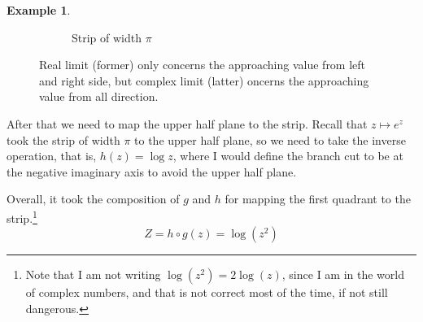 \documentclass[a4paper, 12pt]{article}
\theoremstyle{definition}
\newtheorem{example}{Example}
\numberwithin{theorem}{section}
\numberwithin{definition}{section}
\numberwithin{exercise}{section}
\numberwithin{remark}{section}
\numberwithin{figure}{section}
\numberwithin{example}{section}
\begin{document}
\begin{example}
\begin{figure}[tbp]
\begin{subfigure}[b]{0.4\textwidth}
            \caption{Strip of width $\pi$}
        \end{subfigure}
        \caption{Real limit (former) only concerns the approaching value from left and right side, but complex limit (latter) oncerns the approaching value from all direction.}
        \label{fig: Mapping from first quadrant to a strip}
    \end{figure}
    After that we need to map the upper half plane to the strip.
    Recall that $z \mapsto e^{z}$ took the strip of width $\pi$ to the upper half plane,
    so we need to take the inverse operation, that is, $h(z) = \log z$,
    where I would define the branch cut to be at the negative imaginary axis to avoid the upper half plane.

    Overall, it took the composition of $g$ and $h$ for mapping the first quadrant to the strip.\footnote{
        Note that I am not writing $\log \left( z^2 \right) = 2 \log \left( z \right)$,
        since I am in the world of complex numbers, and that is not correct most of the time, if not still dangerous.
    }
    \begin{equation*}
        Z = h \circ g (z) = \log \left( z^2 \right)
    \end{equation*}


\end{example}
\end{document}
